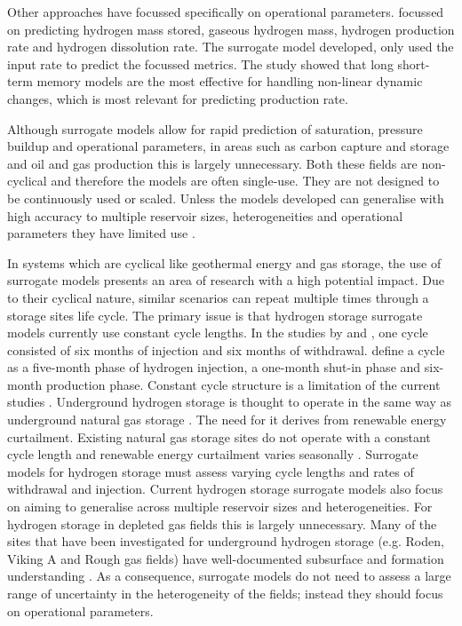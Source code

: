 Other approaches have focussed specifically on operational parameters. \citet{H2storeoptim} focussed on predicting hydrogen mass stored, gaseous hydrogen mass, hydrogen production rate and hydrogen dissolution rate. The surrogate model developed, only used the input rate to predict the focussed metrics. The study showed that long short-term memory models are the most effective for handling non-linear dynamic changes, which is most relevant for predicting production rate. 

 Although surrogate models allow for rapid prediction of saturation, pressure buildup and operational parameters, in areas such as carbon capture and storage and oil and gas production this is largely unnecessary. Both these fields are non-cyclical and therefore the models are often single-use. They are not designed to be continuously used or scaled. Unless the models developed can generalise with high accuracy to multiple reservoir sizes, heterogeneities and operational parameters they have limited use \citep{motaei2026advancements}. 

In systems which are cyclical like geothermal energy and gas storage, the use of surrogate models presents an area of research with a high potential impact. Due to their cyclical nature, similar scenarios can repeat multiple times through a storage sites life cycle. The primary issue is that hydrogen storage surrogate models currently use constant cycle lengths. In the studies by \citet{FU_uhs_Surrogate} and \citet{MAO_cushion}, one cycle consisted of six months of injection and six months of withdrawal. \citet{H2storeoptim} define a cycle as a five-month phase of hydrogen injection, a one-month shut-in phase and six-month production phase. Constant cycle structure is a limitation of the current studies \citep{mao2025deep}. Underground hydrogen storage is thought to operate in the same way as underground natural gas storage \citep{tarkowski2019underground}. The need for it derives from renewable energy curtailment. Existing natural gas storage sites do not operate with a constant cycle length and renewable energy curtailment varies seasonally \citep{pellow2015hydrogen}. Surrogate models for hydrogen storage must assess varying cycle lengths and rates of withdrawal and injection. Current hydrogen storage surrogate models also focus on aiming to generalise across multiple reservoir sizes and heterogeneities. For hydrogen storage in depleted gas fields this is largely unnecessary. Many of the sites that have been investigated for underground hydrogen storage (e.g. Roden, Viking A and Rough gas fields) have well-documented subsurface and formation understanding \citep{UHS_fields_Saadat}. As a consequence, surrogate models do not need to assess a large range of uncertainty in the heterogeneity of the fields; instead they should focus on operational parameters. 

